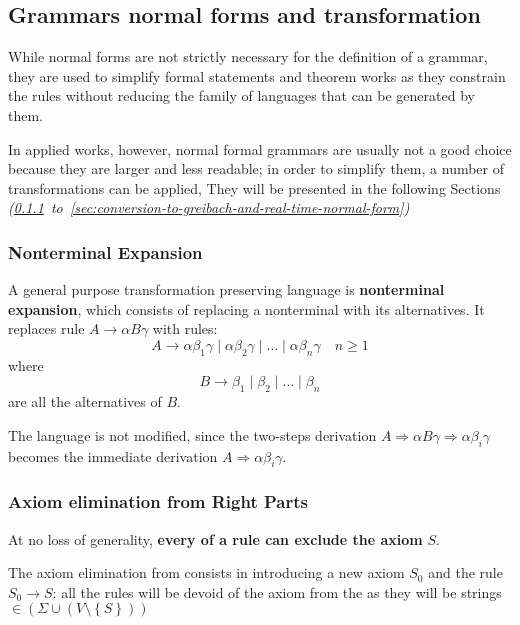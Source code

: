 \documentclass[english]{article}
\begin{document}
\subsection{Grammars normal forms and transformation}

While normal forms are not strictly necessary for the definition of a grammar, they are used to simplify formal statements and theorem works as they constrain the rules without reducing the family of languages that can be generated by them.

In applied works, however, normal formal grammars are usually not a good choice because they are larger and less readable;
in order to simplify them, a number of transformations can be applied,
They will be presented in the following Sections \textit{(\ref{sec:nonterminal-expansion}~to~\ref{sec:conversion-to-greibach-and-real-time-normal-form})}

\subsubsection{Nonterminal Expansion}
\label{sec:nonterminal-expansion}

A general purpose transformation preserving language is \textbf{nonterminal expansion}, which consists of replacing a nonterminal with its alternatives.
It replaces rule \(A \rightarrow \alpha B \gamma\) with rules:
\[ A \rightarrow \alpha \beta_1 \gamma \mid \alpha \beta_2 \gamma \mid \ldots \mid \alpha \beta_n \gamma \quad n \geq 1 \]
where
\[ B \rightarrow \beta_1 \mid \beta_2 \mid \ldots \mid \beta_n \] are all the alternatives of \(B\).

The language is not modified, since the two-steps derivation \(A \Rightarrow \alpha B \gamma \Rightarrow \alpha \beta_i \gamma\) becomes the immediate derivation \(A \Rightarrow \alpha \beta_i \gamma\).

\subsubsection{Axiom elimination from Right Parts}
\label{sec:axiom-elimination-from-right-parts}

At no loss of generality, \textbf{every \RP of a rule can exclude the axiom} \(S\).

The axiom elimination from \RP consists in introducing a new axiom \(S_0\) and the rule \(S_0 \rightarrow S\):
all the rules will be devoid of the axiom from the \RP as they will be strings \(\in \left( \Sigma \cup \left( V \setminus \left\{ S \right\} \right) \right)\)
\end{document}
